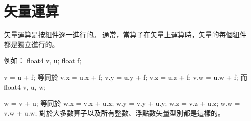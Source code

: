 \section{矢量運算}

矢量運算是按組件逐一進行的。
通常，當算子在矢量上運算時，矢量的每個組件都是獨立進行的。

例如：
\startclc
float4	v, u;
float	f;

v = u + f;
\stopclc
等同於
\startclc
v.x = u.x + f;
v.y = u.y + f;
v.z = u.z + f;
v.w = u.w + f;
\stopclc
而
\startclc
float4	v, u, w;

w = v + u;
\stopclc
等同於
\startclc
w.x = v.x + u.x;
w.y = v.y + u.y;
w.z = v.z + u.z;
w.w = v.w + u.w;
\stopclc
對於大多數算子以及所有整數、浮點數矢量型別都是這樣的。
